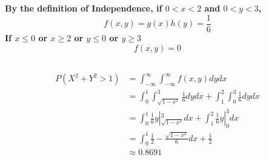 \documentclass{article}
\begin{document}
        \subsection{}
            \paragraph{
                By the definition of Independence, if $0<x<2$ and $0<y<3$,
                $$f(x,y)=g(x)h(y)=\frac{1}{6}$$
                If $x\leq 0$ or $x\geq 2$ or $y\leq 0$ or $y\geq 3$
                $$f(x,y)=0$$
            }
        \subsection{}
            \paragraph{
                \begin{equation}
                    \begin{split}
                        P(X^2+Y^2>1)&=\int _{-\infty} ^\infty \int _{-\infty} ^\infty f(x,y)dy dx\\
                        &=\int _0 ^1 \int _{\sqrt{1-x^2}} ^3 \frac{1}{6} dy dx+\int _1 ^2 \int _0 ^3 \frac{1}{6} dy dx\\
                        &=\int _0 ^1 \frac{1}{6}y| _{\sqrt{1-x^2}} ^3 dx+\int _1 ^2 \frac{1}{6}y| _{0} ^3 dx\\
                        &=\int _0 ^1 \frac{1}{2}-\frac{\sqrt{1-x^2}}{6} dx +\frac{1}{2}\\
                        &\approx 0.8691
                    \end{split}
                \end{equation}
            }
\end{document}
